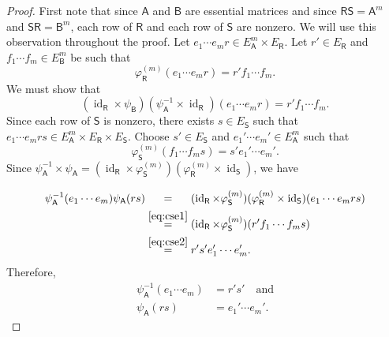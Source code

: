 \documentclass[11pt, letterpaper,final]{amsart}
\newcommand{\id}{\operatorname{id}}
\theoremstyle{definition}
\begin{document}
\begin{proof}
First note that since $\mathsf{A}$ and $\mathsf{B}$ are essential matrices and since $\mathsf{R}\mathsf{S}=\mathsf{A}^m$ and $\mathsf{S}\mathsf{R}=\mathsf{B}^m$, each row of $\mathsf{R}$ and each row of $\mathsf{S}$ are nonzero.   We will use this observation throughout the proof.  Let $e_1\cdots e_m r \in E_\mathsf{A}^m \times E_\mathsf{R}$. Let $r' \in E_\mathsf{R}$ and $f_1\cdots f_m \in E_\mathsf{B}^m$ be such that 
\begin{equation}\label{eq:cse1}
    \varphi_\mathsf{R}^{(m)} ( e_1 \cdots e_m r) = r' f_1 \cdots f_m.
\end{equation}
We must show that 
\begin{equation*}
    (\id_\mathsf{R} \times \psi_\mathsf{B}) (\psi_\mathsf{A}^{-1} \times \id_\mathsf{R}) (e_1\cdots e_m r)=r'f_1\cdots f_m.
\end{equation*}
Since each row of $\mathsf{S}$ is nonzero, there exists $s \in E_\mathsf{S}$ such that $e_1 \cdots e_m rs \in E_\mathsf{A}^m \times E_\mathsf{R} \times E_\mathsf{S}$.    Choose $s' \in E_\mathsf{S}$ and $e_1' \cdots e_m' \in E_\mathsf{A}^m$ such that 
\begin{equation}\label{eq:cse2}
    \varphi_\mathsf{S}^{(m)} ( f_1 \cdots f_m s )= s' e_1' \cdots e_m'.
\end{equation}
 Since $\psi_\mathsf{A}^{-1} \times \psi_\mathsf{A}  =(\id_\mathsf{R} \times \varphi_\mathsf{S}^{(m)}) ( \varphi_\mathsf{R}^{(m)} \times \id_\mathsf{S})$, we have 
\begin{align*}
    \psi_\mathsf{A}^{-1}( e_1 \cdots e_m ) \psi_\mathsf{A} (rs) &\overset{\phantom{\eqref{eq:cse1}}}{=} (\id_\mathsf{R} \times \varphi_\mathsf{S}^{(m)})(\varphi_\mathsf{R}^{(m)} \times \id_\mathsf{S}) (e_1\cdots e_m rs) \\
            &\overset{\eqref{eq:cse1}}{=} (\id_\mathsf{R} \times \varphi_\mathsf{S}^{(m)}) ( r'f_1\cdots f_m s)  \\
            &\overset{\eqref{eq:cse2}}{=}r' s' e_1' \cdots e_m'.
\end{align*}
Therefore, 
\begin{align}
    \psi_\mathsf{A}^{-1}( e_1\cdots e_m) &= r's' \label{eq:cse3} \quad \text{and}\\
    \psi_\mathsf{A}(rs)&= e_1'\cdots e_m' \label{eq:cse4}.
\end{align}


\end{proof}
\end{document}
